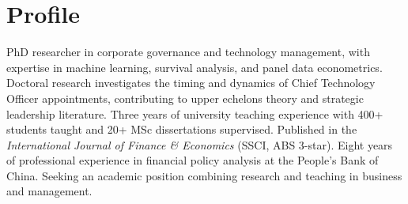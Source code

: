 \section{Profile}
PhD researcher in corporate governance and technology management, with expertise in machine learning, survival analysis, and panel data econometrics. Doctoral research investigates the timing and dynamics of Chief Technology Officer appointments, contributing to upper echelons theory and strategic leadership literature. Three years of university teaching experience with 400+ students taught and 20+ MSc dissertations supervised. Published in the \textit{International Journal of Finance \& Economics} (SSCI, ABS 3-star). Eight years of professional experience in financial policy analysis at the People's Bank of China. Seeking an academic position combining research and teaching in business and management.
